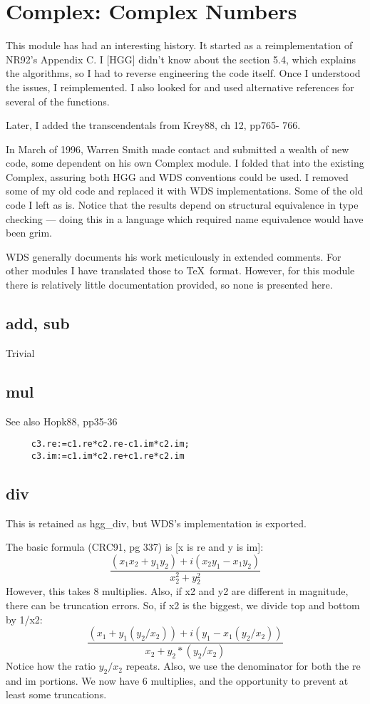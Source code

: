 \section{Complex: Complex Numbers}
This module has had an interesting history.  It started as a reimplementation
of NR92's Appendix C.  I [HGG] didn't know about the section 5.4, which
explains the algorithms, so I had to reverse engineering the code itself.
Once I understood the issues, I reimplemented.  I also looked for
and used alternative references for several of the functions.

Later, I added the transcendentals from Krey88, ch 12, pp765-
766. 

In March of 1996, Warren Smith made contact and submitted a wealth of
new code, some dependent on his own Complex module.  I folded that into
the existing Complex, assuring both HGG and WDS conventions could be used.
I removed some of my old code and replaced it with WDS implementations.
Some of the old code I left as is.  Notice that the results depend on
structural equivalence in type checking --- doing this in a language
which required name equivalence would have been grim. 

WDS generally documents his work meticulously in extended comments.  
For other modules I have translated those to \TeX\ format.  
However, for this
module there is relatively little documentation provided, so none is
presented here.

\subsection*{add, sub}
Trivial

\subsection*{mul}
See also Hopk88, pp35-36
\begin{verbatim}
     c3.re:=c1.re*c2.re-c1.im*c2.im;
     c3.im:=c1.im*c2.re+c1.re*c2.im
\end{verbatim}     


\subsection*{div}
This is retained as hgg\_div, but WDS's implementation is exported.

The basic formula (CRC91, pg 337) is [x is re and y is im]:
\begin{equation}
  \frac{(x_1x_2+y_1y_2) + i(x_2y_1-x_1y_2)}
       {x_2^2 + y_2^2}
\end{equation}
However, this takes 8 multiplies.  Also, if x2 and y2 are
different in magnitude, there can be truncation errors.  So,
if x2 is the biggest, we divide top and bottom by 1/x2:
\begin{equation}
  \frac{(x_1+y_1(y_2/x_2)) + i(y_1 - x_1(y_2/x_2))}
       {x_2 + y_2*(y_2/x_2)}
\end{equation}
Notice how the ratio $y_2/x_2$ repeats.  Also, we use the
denominator for both the re and im portions.  We now have 6
multiplies, and the opportunity to prevent at least some
truncations.

